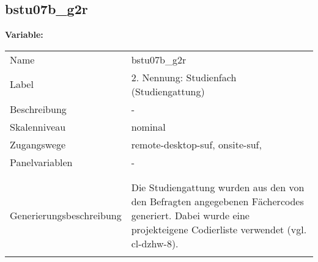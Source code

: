 	
	
	\subsection{bstu07b\_g2r}
	\label{subSection:bstu07b_g2r}

	\noindent\textbf{Variable:}\\
		\begin{tabular}{lL{11.3cm}}
			\label{tableVariable:bstu07b_g2r}
			Name & bstu07b\_g2r \\
			Label & 2. Nennung: Studienfach (Studiengattung) \\
			Beschreibung & - \\
			Skalenniveau & nominal \\
			Zugangswege &
				remote-desktop-suf,
				onsite-suf,
 \\
			Panelvariablen & -
			 \\
			 \\
 \\
					Generierungsbeschreibung & Die Studiengattung wurden aus den von den Befragten angegebenen Fächercodes generiert.  Dabei wurde eine projekteigene Codierliste verwendet (vgl. cl-dzhw-8).
				 \\	
			 \\
		\end{tabular}







